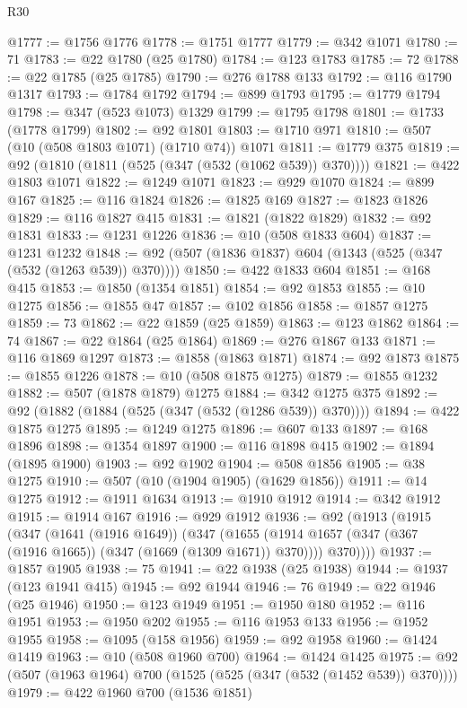 \begin{lexlean}{R30}
\begin{coremodule}
@1777 := @1756 @1776
@1778 := @1751 @1777
@1779 := @342 @1071
@1780 := 71
@1783 := @22 @1780 (@25 @1780)
@1784 := @123 @1783
@1785 := 72
@1788 := @22 @1785 (@25 @1785)
@1790 := @276 @1788 @133
@1792 := @116 @1790 @1317
@1793 := @1784 @1792
@1794 := @899 @1793
@1795 := @1779 @1794
@1798 := @347 (@523 @1073) @1329
@1799 := @1795 @1798
@1801 := @1733 (@1778 @1799)
@1802 := @92 @1801
@1803 := @1710 @971
@1810 := @507 (@10 (@508 @1803 @1071) (@1710 @74)) @1071
@1811 := @1779 @375
@1819 := @92 (@1810 (@1811 (@525 (@347 (@532 (@1062 @539)) @370))))
@1821 := @422 @1803 @1071
@1822 := @1249 @1071
@1823 := @929 @1070
@1824 := @899 @167
@1825 := @116 @1824
@1826 := @1825 @169
@1827 := @1823 @1826
@1829 := @116 @1827 @415
@1831 := @1821 (@1822 @1829)
@1832 := @92 @1831
@1833 := @1231 @1226
@1836 := @10 (@508 @1833 @604)
@1837 := @1231 @1232
@1848 := @92 (@507 (@1836 @1837) @604 (@1343 (@525 (@347 (@532 (@1263 @539)) @370))))
@1850 := @422 @1833 @604
@1851 := @168 @415
@1853 := @1850 (@1354 @1851)
@1854 := @92 @1853
@1855 := @10 @1275
@1856 := @1855 @47
@1857 := @102 @1856
@1858 := @1857 @1275
@1859 := 73
@1862 := @22 @1859 (@25 @1859)
@1863 := @123 @1862
@1864 := 74
@1867 := @22 @1864 (@25 @1864)
@1869 := @276 @1867 @133
@1871 := @116 @1869 @1297
@1873 := @1858 (@1863 @1871)
@1874 := @92 @1873
@1875 := @1855 @1226
@1878 := @10 (@508 @1875 @1275)
@1879 := @1855 @1232
@1882 := @507 (@1878 @1879) @1275
@1884 := @342 @1275 @375
@1892 := @92 (@1882 (@1884 (@525 (@347 (@532 (@1286 @539)) @370))))
@1894 := @422 @1875 @1275
@1895 := @1249 @1275
@1896 := @607 @133
@1897 := @168 @1896
@1898 := @1354 @1897
@1900 := @116 @1898 @415
@1902 := @1894 (@1895 @1900)
@1903 := @92 @1902
@1904 := @508 @1856
@1905 := @38 @1275
@1910 := @507 (@10 (@1904 @1905) (@1629 @1856))
@1911 := @14 @1275
@1912 := @1911 @1634
@1913 := @1910 @1912
@1914 := @342 @1912
@1915 := @1914 @167
@1916 := @929 @1912
@1936 := @92
    (@1913
      (@1915
        (@347
          (@1641 (@1916 @1649))
          (@347
            (@1655 (@1914 @1657 (@347 (@367 (@1916 @1665)) (@347 (@1669 (@1309 @1671)) @370))))
            @370))))
@1937 := @1857 @1905
@1938 := 75
@1941 := @22 @1938 (@25 @1938)
@1944 := @1937 (@123 @1941 @415)
@1945 := @92 @1944
@1946 := 76
@1949 := @22 @1946 (@25 @1946)
@1950 := @123 @1949
@1951 := @1950 @180
@1952 := @116 @1951
@1953 := @1950 @202
@1955 := @116 @1953 @133
@1956 := @1952 @1955
@1958 := @1095 (@158 @1956)
@1959 := @92 @1958
@1960 := @1424 @1419
@1963 := @10 (@508 @1960 @700)
@1964 := @1424 @1425
@1975 := @92 (@507 (@1963 @1964) @700 (@1525 (@525 (@347 (@532 (@1452 @539)) @370))))
@1979 := @422 @1960 @700 (@1536 @1851)

\end{coremodule}
\end{lexlean}
